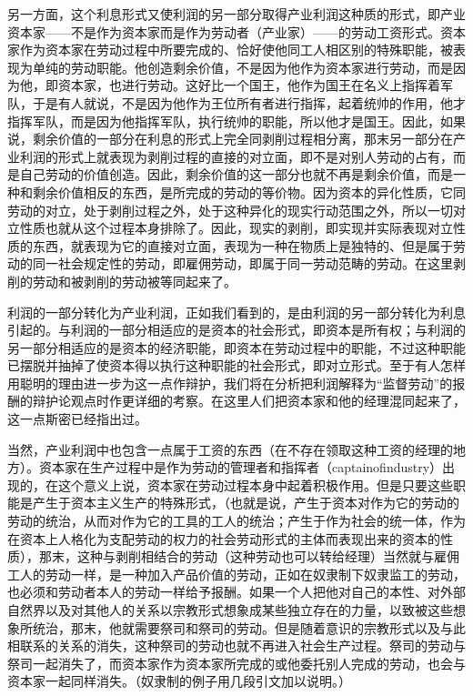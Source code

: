 另一方面，这个利息形式又使利润的另一部分取得产业利润这种质的形式，即产业资本家——不是作为资本家而是作为劳动者（产业家）——的劳动工资形式。资本家作为资本家在劳动过程中所要完成的、恰好使他同工人相区别的特殊职能，被表现为单纯的劳动职能。他创造剩余价值，不是因为他作为资本家进行劳动，而是因为他，即资本家，也进行劳动。这好比一个国王，他作为国王在名义上指挥着军队，于是有人就说，不是因为他作为王位所有者进行指挥，起着统帅的作用，他才指挥军队，而是因为他指挥军队，执行统帅的职能，所以他才是国王。因此，如果说，剩余价值的一部分在利息的形式上完全同剥削过程相分离，那末另一部分在产业利润的形式上就表现为剥削过程的直接的对立面，即不是对别人劳动的占有，而是自己劳动的价值创造。因此，剩余价值的这一部分也就不再是剩余价值，而是一种和剩余价值相反的东西，是所完成的劳动的等价物。因为资本的异化性质，它同劳动的对立，处于剥削过程之外，处于这种异化的现实行动范围之外，所以一切对立性质也就从这个过程本身排除了。因此，现实的剥削，即实现并实际表现对立性质的东西，就表现为它的直接对立面，表现为一种在物质上是独特的、但是属于劳动的同一社会规定性的劳动，即雇佣劳动，即属于同一劳动范畴的劳动。在这里剥削的劳动和被剥削的劳动被等同起来了。

利润的一部分转化为产业利润，正如我们看到的，是由利润的另一部分转化为利息引起的。与利润的一部分相适应的是资本的社会形式，即资本是所有权；与利润的另一部分相适应的是资本的经济职能，即资本在劳动过程中的职能，不过这种职能已摆脱并抽掉了使资本得以执行这种职能的社会形式，即对立形式。至于有人怎样用聪明的理由进一步为这一点作辩护，我们将在分析把利润解释为“监督劳动”的报酬的辩护论观点时作更详细的考察。在这里人们把资本家和他的经理混同起来了，这一点斯密已经指出过。

当然，产业利润中也包含一点属于工资的东西（在不存在领取这种工资的经理的地方）。资本家在生产过程中是作为劳动的管理者和指挥者（captainofindustry）出现的，在这个意义上说，资本家在劳动过程本身中起着积极作用。但是只要这些职能是产生于资本主义生产的特殊形式，（也就是说，产生于资本对作为它的劳动的劳动的统治，从而对作为它的工具的工人的统治；产生于作为社会的统一体，作为在资本上人格化为支配劳动的权力的社会劳动形式的主体而表现出来的资本的性质），那末，这种与剥削相结合的劳动（这种劳动也可以转给经理）当然就与雇佣工人的劳动一样，是一种加入产品价值的劳动，正如在奴隶制下奴隶监工的劳动，也必须和劳动者本人的劳动一样给予报酬。如果一个人把他对自己的本性、对外部自然界以及对其他人的关系以宗教形式想象成某些独立存在的力量，以致被这些想象所统治，那末，他就需要祭司和祭司的劳动。但是随着意识的宗教形式以及与此相联系的关系的消失，这种祭司的劳动也就不再进入社会生产过程。祭司的劳动与祭司一起消失了，而资本家作为资本家所完成的或他委托别人完成的劳动，也会与资本家一起同样消失。（奴隶制的例子用几段引文加以说明。）

